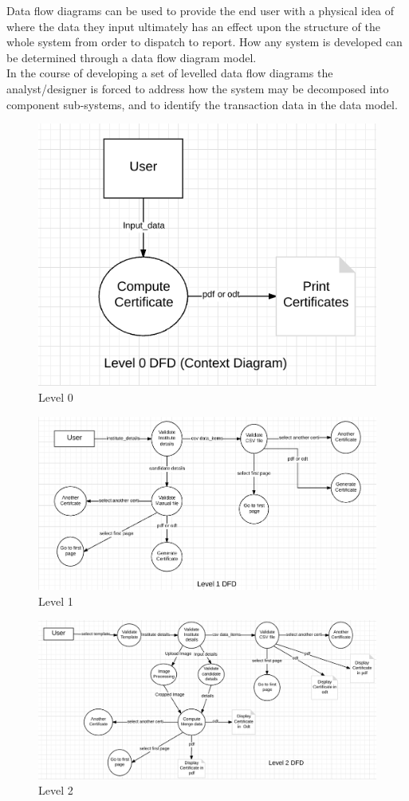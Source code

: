 Data flow diagrams can be used to provide the end user with a physical idea of where the data they input ultimately has an effect upon the structure of the whole system from order to dispatch to report. How any system is developed can be determined through a data flow diagram model.\\
In the course of developing a set of levelled data flow diagrams the analyst/designer is forced to address how the system may be decomposed into component sub-systems, and to identify the transaction data in the data model.
\begin{figure}[!th]
\centering
\includegraphics[width=0.7\linewidth]{input/images/dfd0.png}
\caption{Level 0}
\label{fig:image1}
\end{figure}

\begin{figure}[!th]
\centering
\includegraphics[width=0.7\linewidth]{input/images/dfd_1.png}
\caption{Level 1}
\label{fig:image1}
\end{figure}

\begin{figure}[!th]
\centering
\includegraphics[width=0.7\linewidth]{input/images/dfd_2.png}
\caption{Level 2}
\label{fig:image1}
\end{figure}
